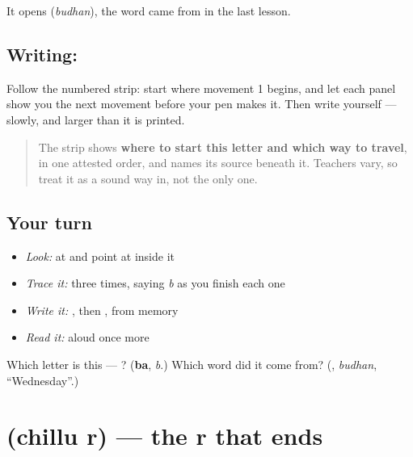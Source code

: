 It opens \textbf{} (\emph{budhan}), the word \textbf{} came from in the last lesson.

\subsection*{Writing: }

Follow the numbered strip: start where movement 1 begins, and let each panel show you the next movement before your pen makes it. Then write  yourself — slowly, and larger than it is printed.

\begin{quote}
The strip shows \textbf{where to start this letter and which way to travel}, in one attested order, and names its source beneath it. Teachers vary, so treat it as a sound way in, not the only one.
\end{quote}

\subsection*{Your turn}
\begin{itemize}
\raggedright
  \item \emph{Look:} at \textbf{} and point at  inside it
  \item \emph{Trace it:}  three times, saying \emph{b} as you finish each one
  \item \emph{Write it:} , then , from memory
  \item \emph{Read it:} \textbf{} aloud once more
\end{itemize}

\begin{tcolorbox}[breakable,colback=teal!4,colframe=teal!35!black,title={Before you move on}]
Which letter is this — ? (\textbf{ba}, \emph{b}.) Which word did it come from? (\textbf{}, \emph{budhan}, \textquotedblleft{}Wednesday\textquotedblright{}.)
\end{tcolorbox}
\section[\texorpdfstring{\ml{ർ} (chillu r)}{ർ (chillu r)}]{ (chillu r) — the r that ends }

\label{lesson:ML-W114-chillu-rr}




